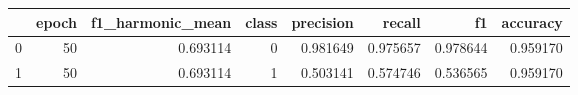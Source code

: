 \begin{tabular}{lrrrrrrr}
\toprule
 & epoch & f1_harmonic_mean & class & precision & recall & f1 & accuracy \\
\midrule
0 & 50 & 0.693114 & 0 & 0.981649 & 0.975657 & 0.978644 & 0.959170 \\
1 & 50 & 0.693114 & 1 & 0.503141 & 0.574746 & 0.536565 & 0.959170 \\
\bottomrule
\end{tabular}
